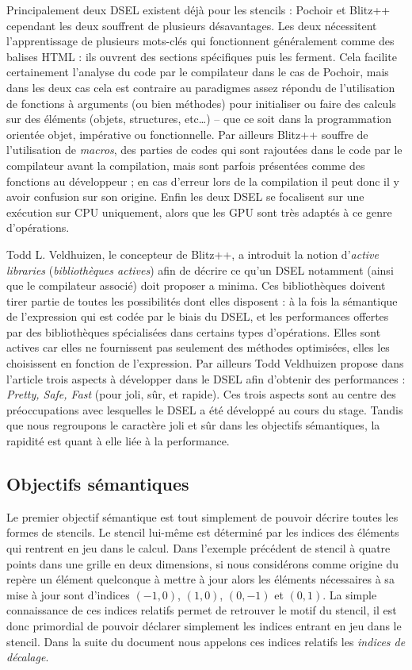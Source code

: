 Principalement deux DSEL existent déjà pour les stencils : \textsf{Pochoir} et \textsf{Blitz++} cependant les deux souffrent de plusieurs désavantages. Les deux nécessitent l'apprentissage de plusieurs mots-clés qui fonctionnent généralement comme des balises HTML : ils ouvrent des sections spécifiques puis les ferment. Cela facilite certainement l'analyse du code par le compilateur dans le cas de \textsf{Pochoir}, mais dans les deux cas cela est contraire au paradigmes assez répondu de l'utilisation de fonctions à arguments (ou bien méthodes) pour initialiser ou faire des calculs sur des éléments (objets, structures, etc\ldots) -- que ce soit dans la programmation orientée objet, impérative ou fonctionnelle. Par ailleurs \textsf{Blitz++} souffre de l'utilisation de \emph{macros}, des parties de codes qui sont rajoutées dans le code par le compilateur avant la compilation, mais sont parfois présentées comme des fonctions au développeur ; en cas d'erreur lors de la compilation il peut donc il y avoir confusion sur son origine. Enfin les deux DSEL se focalisent sur une exécution sur CPU uniquement, alors que les GPU sont très adaptés à ce genre d'opérations.

Todd L. Veldhuizen, le concepteur de \textsf{Blitz++}, a introduit la notion d'\emph{active libraries} (\emph{bibliothèques actives}) \cite{Art20} afin de décrire ce qu'un DSEL notamment (ainsi que le compilateur associé) doit proposer a minima. Ces bibliothèques doivent tirer partie de toutes les possibilités dont elles disposent : à la fois la sémantique de l'expression qui est codée par le biais du DSEL, et les performances offertes par des bibliothèques spécialisées dans certains types d'opérations. Elles sont actives car elles ne fournissent pas seulement des méthodes optimisées, elles les choisissent en fonction de l'expression. Par ailleurs Todd Veldhuizen propose dans l'article \cite{Art22} trois aspects à développer dans le DSEL afin d'obtenir des performances : \emph{Pretty, Safe, Fast} (pour joli, sûr, et rapide). Ces trois aspects sont au centre des préoccupations avec lesquelles le DSEL a été développé au cours du stage. Tandis que nous regroupons le caractère joli et sûr dans les objectifs sémantiques, la rapidité est quant à elle liée à la performance.

\subsection{Objectifs sémantiques}
\label{sec:obj_sem}

Le premier objectif sémantique est tout simplement de pouvoir décrire toutes les formes de stencils. Le stencil lui-même est déterminé par les indices des éléments qui rentrent en jeu dans le calcul. Dans l'exemple précédent de stencil à quatre points dans une grille en deux dimensions, si nous considérons comme origine du repère un élément quelconque à mettre à jour alors les éléments nécessaires à sa mise à jour sont d'indices $(-1,0)$, $(1,0)$, $(0,-1)$ et $(0,1)$. La simple connaissance de ces indices relatifs permet de retrouver le motif du stencil, il est donc primordial de pouvoir déclarer simplement les indices entrant en jeu dans le stencil. Dans la suite du document nous appelons ces indices relatifs les \emph{indices de décalage}.

